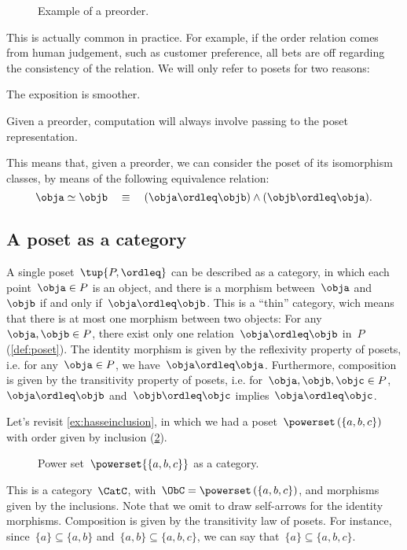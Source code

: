 \begin{figure}[tbh]
\begin{center}
\end{center}
\caption{Example of a preorder. \label{fig:preorder}}
\end{figure}

This is actually common in practice. For example, if the order relation comes from human judgement, such as customer preference, all bets are off regarding the consistency of the relation. We will only refer to posets for two reasons:
\begin{compactenum}
        \item The exposition is smoother.
        \item Given a preorder, computation will always involve passing to the poset representation.
\end{compactenum}
This means that, given a preorder, we can consider the poset of its isomorphism classes, by means of the following equivalence relation:
\begin{equation}
        \obja \simeq \objb \quad \equiv \quad (\obja \ordleq \objb) \wedge (\objb \ordleq \obja).
\end{equation}

\subsection{A poset as a category}
\label{sec:posetsarecats}
A single poset~$\tup{P, \ordleq}$ can be described as a category, in which each point~$\obja\in P$ is an object, and there is a morphism between~$\obja$ and~$\objb$ if and only if~$\obja \ordleq \objb$. This is a ``thin'' category, wich means that there is at most one morphism
between two objects: For any~$\obja,\objb\in P$, there exist only one relation~$\obja\ordleq \objb$ in~$P$ (\cref{def:poset}). The identity morphism is given by the reflexivity property of posets, i.e. for any~$\obja\in P$, we have~$\obja \ordleq \obja$. Furthermore, composition is given by the transitivity property of posets, i.e. for~$\obja,\objb,\objc \in P$,~$\obja\ordleq \objb$ and~$\objb\ordleq \objc$ implies~$\obja\ordleq \objc$.

\begin{example}
Let's revisit \cref{ex:hasseinclusion}, in which we had a poset~$\powerset\left(\{a,b,c\}\right)$ with order given by inclusion (\cref{fig:posetascat}).
\begin{figure}[h!]
\begin{center}
\end{center}
\caption{Power set~$\powerset{\{a,b,c\}}$ as a category. \label{fig:posetascat}}
\end{figure}
This is a category~$\CatC$, with~$\ObC=\powerset\left(\{a,b,c\}\right)$, and morphisms given by the inclusions. Note that we omit to draw self-arrows for the identity morphisms. Composition is given by the transitivity law of posets. For instance, since~$\{a\}\subseteq \{a,b\}$ and~$\{a,b\} \subseteq \{a,b,c\}$, we can say that~$\{a\}\subseteq \{a,b,c\}$.
\end{example}

